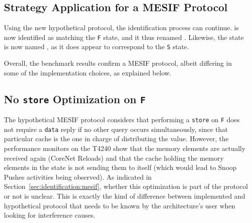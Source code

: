 \subsection{Strategy Application for a MESIF Protocol}
\label{sec:identification:second_application}
Using the new hypothetical protocol, the identification process can continue.
\benchs{} is now identified as matching the \texttt{F} state, and it thus
renamed \benchf{}.  Likewise, the \benchx{} state is now named \benchts{}, as it
does appear to correspond to the \texttt{S} state.

Overall, the benchmark results confirm a MESIF protocol, albeit differing in
some of the implementation choices, as explained below.

\subsection{No \texttt{store} Optimization on \texttt{F}}
The hypothetical MESIF protocol considers that performing a \texttt{store} on
\texttt{F} does not require a \texttt{data} reply if no other query occurs
simultaneously, since that particular cache is the one in charge of distributing
the value. However, the performance monitors on the T4240 show that the memory
elements are actually received again (CoreNet Reloads) and that the cache
holding the memory elements in the \benchf{} state is not sending them to itself
(which would lead to Snoop Pushes activities being observed). As indicated in
Section~\ref{sec:identification:mesif}, whether this optimization is part of the
protocol or not is unclear. This is exactly the kind of difference between
implemented and hypothetical protocol that needs to be known by the
architecture's user when looking for interference causes.


